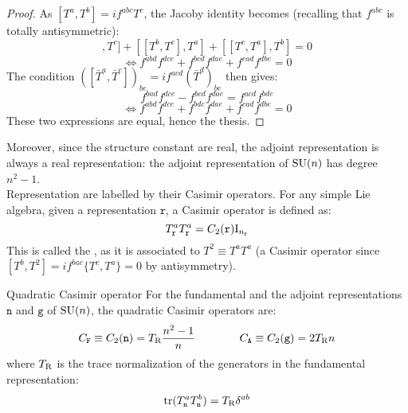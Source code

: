 \begin{proofbox}
  \begin{proof}
    As $ [T^a,T^b] = i f^{abc} T^c $, the Jacoby identity becomes (recalling that $ f^{abc} $ is totally antisymmetric):
    \begin{equation*}
      [[T^a,T^b],T^c] + [[T^b,T^c],T^a] + [[T^c,T^a],T^b] = 0
    \end{equation*}
    \begin{equation*}
      \iff f^{abd} f^{dce} + f^{bcd} f^{dae} + f^{cad} f^{dbe} = 0
    \end{equation*}
    The condition $ ([\bar{T}^a , \bar{T}^c])_{be} = i f^{acd} (\bar{T}^d)_{be} $ then gives:
    \begin{equation*}
      f^{bad} f^{dce} - f^{bcd} f^{dae} = f^{acd} f^{bde}
    \end{equation*}
    \begin{equation*}
      \iff f^{abd} f^{dce} + f^{bdc} f^{dae} + f^{cad} f^{dbe} = 0
    \end{equation*}
    These two expressions are equal, hence the thesis.
  \end{proof}
\end{proofbox}

Moreover, since the structure constant are real, the adjoint representation is always a real representation: the adjoint representation of $ \mathrm{SU}(n) $ has degree $ n^2 - 1 $.\\
Representation are labelled by their Casimir operators. For any simple Lie algebra, given a representation $ \mathtt{r} $, a Casimir operator is defined as:
\begin{equation}
  T^a_\mathtt{r} T^a_\mathtt{r} = C_2(\mathtt{r}) \mathrm{I}_{n_{\mathtt{r}}}
  \label{eq:quad-cas}
\end{equation}
This is called the , as it is associated to $ T^2 \equiv T^a T^a $ (a Casimir operator since $ [T^b, T^2] = i f^{bac} \{T^c,T^a\} = 0 $ by antisymmetry).

\begin{proposition}{Quadratic Casimir operator}{}
  For the fundamental and the adjoint representations $ \mathtt{n} $ and $ \mathtt{g} $ of $ \mathrm{SU}(n) $, the quadratic Casimir operators are:
  \begin{equation}
    C_\mathtt{F} \equiv C_2(\mathtt{n}) = T_\text{R} \frac{n^2 - 1}{n}
    \qquad \qquad
    C_\mathtt{A} \equiv C_2(\mathtt{g}) = 2T_\text{R} n
  \end{equation}
  where $ T_\text{R} $ is the trace normalization of the generators in the fundamental representation:
  \begin{equation}
    \operatorname{tr} (T^a_\mathtt{n} T^b_\mathtt{n}) = T_\text{R} \delta^{ab}
    \label{eq:diag-norm}
  \end{equation}
\end{proposition}

